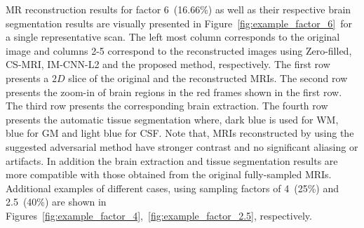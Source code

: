 \documentclass[review]{elsarticle}
\begin{document}
MR reconstruction results for factor 6~(16.66\%) as well as their respective brain segmentation results are visually presented in Figure~\ref{fig:example_factor_6}~for a single representative scan. The left most column corresponds to the original image and columns 2-5 correspond to the reconstructed images using Zero-filled, CS-MRI, IM-CNN-L2 and the proposed method, respectively. The first row presents a $2D$ slice of the original and the reconstructed MRIs. The second row presents the zoom-in of brain regions in the red frames shown in the first row. The third row presents the corresponding brain extraction. The fourth row presents the automatic tissue segmentation where, dark blue is used for WM, blue for GM and light blue for CSF. Note that, MRIs reconstructed by using the suggested adversarial method have stronger contrast and no significant aliasing or artifacts. In addition the brain extraction and tissue segmentation results are more compatible with those obtained from the original fully-sampled MRIs. Additional examples of different cases, using sampling factors of 4~(25\%) and 2.5~(40\%) are shown in Figures~\ref{fig:example_factor_4},~\ref{fig:example_factor_2.5}, respectively.
\end{document}
